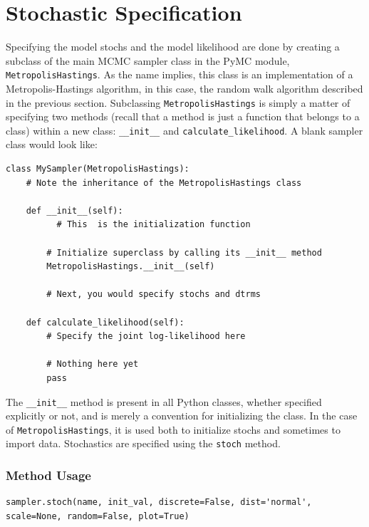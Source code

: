 \documentclass[]{book}
\begin{document}
\section{Stochastic Specification}\label{sec:stoch_specification}

Specifying the model stochs and the model likelihood are done by creating a subclass of the main MCMC sampler class in the PyMC module, \verb=MetropolisHastings=. As the name implies, this class is an implementation of a Metropolis-Hastings algorithm, in this case, the random walk algorithm described in the previous section. Subclassing \verb=MetropolisHastings= is simply a matter of specifying two methods (recall that a method is just a function that belongs to a class) within a new class: \verb=__init__= and \verb=calculate_likelihood=. A blank sampler class would look like:

\begin{verbatim}
class MySampler(MetropolisHastings):
    # Note the inheritance of the MetropolisHastings class

    def __init__(self):
          # This  is the initialization function

        # Initialize superclass by calling its __init__ method
        MetropolisHastings.__init__(self)

        # Next, you would specify stochs and dtrms

    def calculate_likelihood(self):
        # Specify the joint log-likelihood here

        # Nothing here yet
        pass

\end{verbatim}

The \verb=__init__= method is present in all Python classes, whether specified explicitly or not, and is merely a convention for initializing the class. In the case of \verb=MetropolisHastings=, it is used both to initialize stochs and sometimes to import data. Stochastics are specified using the \verb=stoch= method.

\subsubsection*{Method Usage}
\begin{verbatim}
sampler.stoch(name, init_val, discrete=False, dist='normal',
scale=None, random=False, plot=True)
\end{verbatim}
\end{document}

